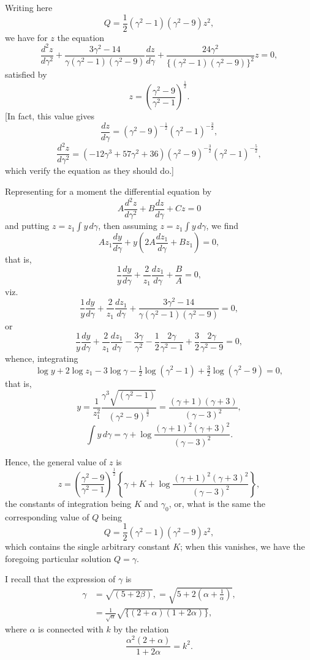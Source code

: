 \documentclass[11pt,a4paper]{book}
\begin{document}
\newpage
\noindent Writing here
\[
Q = \frac{1}{2}(\gamma^2-1)(\gamma^2-9)z^2,
\]
we have for $z$ the equation
\[
\frac{d^2z}{d\gamma^2}
  + \frac{3\gamma^2-14}{\gamma(\gamma^2-1)(\gamma^2-9)}\frac{dz}{d\gamma}
  + \frac{24\gamma^2}{\{(\gamma^2-1)(\gamma^2-9)\}^2}z = 0,
\]
satisfied by
\[
z = \left(\frac{\gamma^2-9}{\gamma^2-1}\right)^{\frac{1}{2}}.
\]
[In fact, this value gives
\[
\frac{dz}{d\gamma} = (\gamma^2-9)^{-\frac{1}{2}}(\gamma^2-1)^{-\frac{3}{2}},
\]
\[
\frac{d^2z}{d\gamma^2}
  = (-12\gamma^3+57\gamma^2+36)
    (\gamma^2-9)^{-\frac{3}{2}}(\gamma^2-1)^{-\frac{5}{2}},
\]
which verify the equation as they should do.]

Representing for a moment the differential equation by
\[A\frac{d^2z}{d\gamma^2} + B\frac{dz}{d\gamma} + Cz = 0\]
and putting $z=z_1\int y\,d\gamma$, then assuming $z=z_1\int y\,d\gamma$, we find
\[
Az_1\frac{dy}{d\gamma}
  + y\left(2A\frac{dz_1}{d\gamma}+Bz_1\right) = 0,
\]
that is,
\[
\frac{1}{y}\frac{dy}{d\gamma}
  + \frac{2}{z_1}\frac{dz_1}{d\gamma} + \frac{B}{A} = 0,
\]
viz.
\[
\frac{1}{y}\frac{dy}{d\gamma}
  + \frac{2}{z_1}\frac{dz_1}{d\gamma}
  + \frac{3\gamma^2-14}{\gamma(\gamma^2-1)(\gamma^2-9)} = 0,
\]
or
\[
\frac{1}{y}\frac{dy}{d\gamma}
  + \frac{2}{z_1}\frac{dz_1}{d\gamma}
  - \frac{3\gamma}{\gamma^2}
  - \frac{1}{2}\frac{2\gamma}{\gamma^2-1}
  + \frac{3}{2}\frac{2\gamma}{\gamma^2-9} = 0,
\]
whence, integrating
\[
\log y + 2\log z_1 - 3\log\gamma - \tfrac{1}{2}\log(\gamma^2-1)
  + \tfrac{3}{2}\log(\gamma^2-9) = 0,
\]
that is,
\[
y = \frac{1}{z_1^2}
    \frac{\gamma^3\sqrt{(\gamma^2-1)}}{(\gamma^2-9)^{\frac{3}{2}}}
  = \frac{(\gamma+1)(\gamma+3)}{(\gamma-3)^2},
\]
\[
\int y\,d\gamma
  = \gamma + \log\frac{(\gamma+1)^2(\gamma+3)^2}{(\gamma-3)^2}.
\]

\newpage
Hence, the general value of $z$ is
\[
z = \left(\frac{\gamma^2-9}{\gamma^2-1}\right)^{\frac{1}{2}}
    \left\{
      \gamma + K + \log\frac{(\gamma+1)^2(\gamma+3)^2}{(\gamma-3)^2}
    \right\},
\]
the constants of integration being $K$ and $\gamma_0$, or, what is the same
the corresponding value of $Q$ being
\[
Q = \frac{1}{2}(\gamma^2-1)(\gamma^2-9)z^2,
\]
which contains the single arbitrary constant $K$; when this vanishes, we have
the foregoing particular solution $Q=\gamma$.

I recall that the expression of $\gamma$ is
\begin{align*}
\gamma &= \sqrt{(5+2\beta)},
       = \sqrt{5+2\left(\alpha+\frac{1}{\alpha}\right)},\\
     &= \frac{1}{\sqrt{\alpha}}\sqrt{\{(2+\alpha)(1+2\alpha)\}},
\end{align*}
where $\alpha$ is connected with $k$ by the relation
\[
\frac{\alpha^2(2+\alpha)}{1+2\alpha} = k^2.
\]
\end{document}
